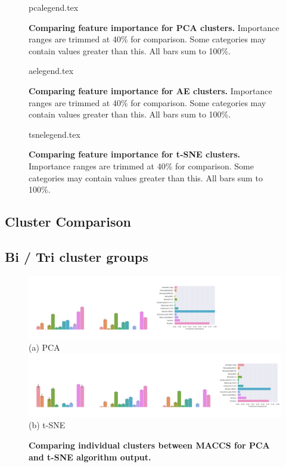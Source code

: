  
\begin{figure}[H]
    {pcalegend.tex}
    \caption{\textbf{Comparing feature importance for PCA clusters.} Importance ranges are trimmed at 40\% for comparison. Some categories may contain values greater than this. All bars sum to 100\%.}
    \label{fig:pcalegend}
\end{figure}
\begin{figure}[H]
    {aelegend.tex}
    \caption{\textbf{Comparing feature importance for AE clusters.} Importance ranges are trimmed at 40\% for comparison. Some categories may contain values greater than this. All bars sum to 100\%. }
    \label{fig:aelegend}
\end{figure}
\begin{figure}[H]
    {tsnelegend.tex}
    \caption{\textbf{Comparing feature importance for t-SNE clusters.} Importance ranges are trimmed at 40\% for comparison. Some categories may contain values greater than this. All bars sum to 100\%.}
    \label{fig:tsnelegend}
\end{figure}


\subsection{Cluster Comparison}\label{sec:selectcomp}

\subsection{Bi / Tri cluster groups }

\begin{landscape}
\begin{figure}[H]
    \centering
         \includegraphics[width=1.35\textheight]{./outputs/PCA/maccs/group.png}
         \\ (a) PCA \\
     \hfill
            \includegraphics[width=1.35\textheight]{./outputs/t-SNE/maccs/group.png}
        \\ (b) t-SNE
        \caption{ \textbf{Comparing individual clusters between MACCS for PCA and t-SNE algorithm output.} }
        \label{fig:biMACCS}
\end{figure}
\end{landscape}



